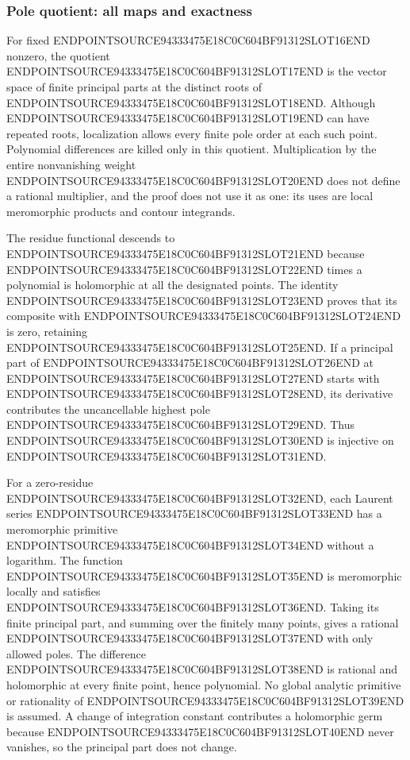 \subsubsection{Pole quotient: all maps and exactness}\label{endpoint-analytic_pole_review--pole-quotient-all-maps-and-exactness}

For fixed ENDPOINTSOURCE94333475E18C0C604BF91312SLOT16END nonzero, the quotient ENDPOINTSOURCE94333475E18C0C604BF91312SLOT17END is the vector space of finite principal parts at the distinct roots of ENDPOINTSOURCE94333475E18C0C604BF91312SLOT18END. Although ENDPOINTSOURCE94333475E18C0C604BF91312SLOT19END can have repeated roots, localization allows every finite pole order at each such point. Polynomial differences are killed only in this quotient. Multiplication by the entire nonvanishing weight ENDPOINTSOURCE94333475E18C0C604BF91312SLOT20END does not define a rational multiplier, and the proof does not use it as one: its uses are local meromorphic products and contour integrands.

The residue functional descends to ENDPOINTSOURCE94333475E18C0C604BF91312SLOT21END because ENDPOINTSOURCE94333475E18C0C604BF91312SLOT22END times a polynomial is holomorphic at all the designated points. The identity ENDPOINTSOURCE94333475E18C0C604BF91312SLOT23END proves that its composite with ENDPOINTSOURCE94333475E18C0C604BF91312SLOT24END is zero, retaining ENDPOINTSOURCE94333475E18C0C604BF91312SLOT25END. If a principal part of ENDPOINTSOURCE94333475E18C0C604BF91312SLOT26END at ENDPOINTSOURCE94333475E18C0C604BF91312SLOT27END starts with ENDPOINTSOURCE94333475E18C0C604BF91312SLOT28END, its derivative contributes the uncancellable highest pole ENDPOINTSOURCE94333475E18C0C604BF91312SLOT29END. Thus ENDPOINTSOURCE94333475E18C0C604BF91312SLOT30END is injective on ENDPOINTSOURCE94333475E18C0C604BF91312SLOT31END.

For a zero-residue ENDPOINTSOURCE94333475E18C0C604BF91312SLOT32END, each Laurent series ENDPOINTSOURCE94333475E18C0C604BF91312SLOT33END has a meromorphic primitive ENDPOINTSOURCE94333475E18C0C604BF91312SLOT34END without a logarithm. The function ENDPOINTSOURCE94333475E18C0C604BF91312SLOT35END is meromorphic locally and satisfies ENDPOINTSOURCE94333475E18C0C604BF91312SLOT36END. Taking its finite principal part, and summing over the finitely many points, gives a rational ENDPOINTSOURCE94333475E18C0C604BF91312SLOT37END with only allowed poles. The difference ENDPOINTSOURCE94333475E18C0C604BF91312SLOT38END is rational and holomorphic at every finite point, hence polynomial. No global analytic primitive or rationality of ENDPOINTSOURCE94333475E18C0C604BF91312SLOT39END is assumed. A change of integration constant contributes a holomorphic germ because ENDPOINTSOURCE94333475E18C0C604BF91312SLOT40END never vanishes, so the principal part does not change.

